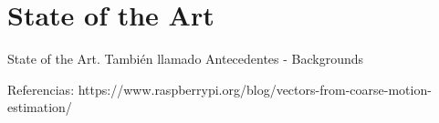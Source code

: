 \chapter{State of the Art} %
\label{chap:state_of_the_art}

State of the Art. También llamado
Antecedentes - Backgrounds





Referencias:
https://www.raspberrypi.org/blog/vectors-from-coarse-motion-estimation/









